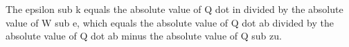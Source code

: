 The epsilon sub k equals the absolute value of Q dot in divided by the absolute value of W sub e, which equals the absolute value of Q dot ab divided by the absolute value of Q dot ab minus the absolute value of Q sub zu.
